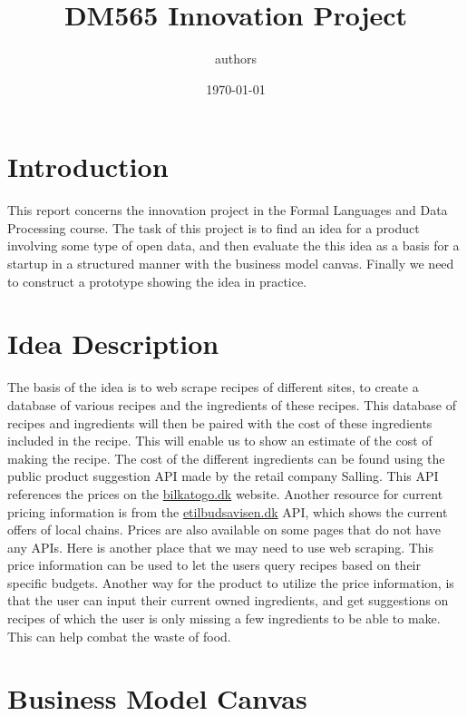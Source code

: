 \documentclass{article}
\title{DM565 Innovation Project}
\author{authors}
\date{\today}
\begin{document}
\maketitle

\newpage

\tableofcontents

\newpage

\section{Introduction}
This report concerns the innovation project in the Formal Languages and Data Processing
course. The task of this project is to find an idea for a product involving some type of
open data, and then  evaluate the this idea as a
basis for a startup in a structured manner with the business model canvas.
Finally we need to construct a prototype showing the idea in practice. 
\section{Idea Description}
\begin{comment}
 we need to focus our idea, as discussed in the midwayseminar. The best is to have a core
idea that we focus on. 
\end{comment}
The basis of the idea is to  web scrape recipes of different sites, to create a database
of various recipes and the ingredients of these recipes. This database of recipes and
ingredients will then be
paired with the cost of these ingredients included in the recipe. This will enable us to
show an estimate of the cost of making the recipe. The cost of the different ingredients can be
found using the public product suggestion API made by the retail company Salling. This API
references the prices on the \url{bilkatogo.dk} website. Another resource for current
pricing information is from the \url{etilbudsavisen.dk} API, which shows the current
offers of local chains. Prices are also available on some pages that do not have any APIs.
Here is another place that we may need to use web scraping. This price information can
be used to let the users query recipes based on their specific budgets. Another way for
the product to utilize the price information, is that the user can input their current owned
ingredients, and get suggestions on  recipes of which the user is only missing a few
ingredients to be able to make. This can help combat the waste of food.


\section{Business Model Canvas}
\end{document}
